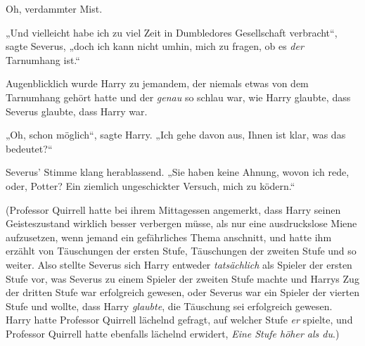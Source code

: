 Oh, verdammter Mist.

„Und vielleicht habe ich zu viel Zeit in Dumbledores Gesellschaft verbracht“, sagte Severus, „doch ich kann nicht umhin, mich zu fragen, ob es \emph{der} Tarnumhang ist.“

Augenblicklich wurde Harry zu jemandem, der niemals etwas von dem Tarnumhang gehört hatte und der \emph{genau} so schlau war, wie Harry glaubte, dass Severus glaubte, dass Harry war.

„Oh, schon möglich“, sagte Harry.
„Ich gehe davon aus, Ihnen ist klar, was das bedeutet?“

Severus’ Stimme klang herablassend.
„Sie haben keine Ahnung, wovon ich rede, oder, Potter? Ein ziemlich ungeschickter Versuch, mich zu ködern.“

(Professor Quirrell hatte bei ihrem Mittagessen angemerkt, dass Harry seinen Geisteszustand wirklich besser verbergen müsse, als nur eine ausdruckslose Miene aufzusetzen, wenn jemand ein gefährliches Thema anschnitt, und hatte ihm erzählt von Täuschungen der ersten Stufe, Täuschungen der zweiten Stufe und so weiter. Also stellte Severus sich Harry entweder \emph{tatsächlich} als Spieler der ersten Stufe vor, was Severus zu einem Spieler der zweiten Stufe machte und Harrys Zug der dritten Stufe war erfolgreich gewesen, oder Severus war ein Spieler der vierten Stufe und wollte, dass Harry \emph{glaubte}, die Täuschung sei erfolgreich gewesen. Harry hatte Professor Quirrell lächelnd gefragt, auf welcher Stufe \emph{er} spielte, und Professor Quirrell hatte ebenfalls lächelnd erwidert, \emph{Eine Stufe höher als du}.)

